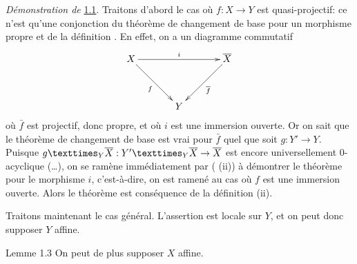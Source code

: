 \documentclass[10pt]{../fichiers-configuration-latex/smfart}
\begin{document}
\noindent
\emph{Démonstration de} \hyperref[XVI.thm1.1]{1.1}. Traitons d'abord le cas où
$f:X\rightarrow Y$ est quasi-projectif: ce n'est qu'une conjonction du
théorème de changement de base pour un morphisme propre  et de
la définition . En effet, on a un diagramme commutatif
$$
\xymatrix@=1.25cm{
 X \ar[rr]^{i} \ar[rd]_{f}&        & \bar{X}\ar[ld]^{\bar{f}}\\
                         &   Y    &
}
$$
où $\bar{f}$ est projectif, donc propre, et où $i$ est une immersion
ouverte. Or on sait  que le théorème de changement de base est
vrai pour $\bar{f}$ quel que soit $g:Y'\rightarrow Y$. Puisque
$\fprod{g}{\bar{X}}{Y}:\fprod{Y'}{\bar{X}}{Y}\rightarrow \bar{X}$ est
encore universellement $0$-acyclique (\resp\ldots), on se ramène
immédiatement par ( (ii)) à démontrer le théorème pour le
morphisme $i$, c'est-à-dire, on est ramené au cas où $f$ est une
immersion ouverte. Alors le théorème est conséquence de la définition
 (ii).

Traitons maintenant le cas général. L'assertion est locale sur $Y$, et
on peut donc supposer $Y$ affine.

\begin{enonce*}{Lemme 1.3}
On peut de plus supposer $X$ affine.
\end{enonce*}
\end{document}

